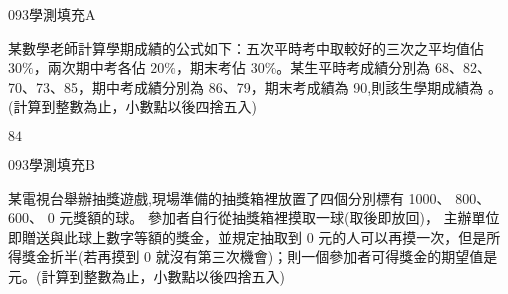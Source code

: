 \begin{QUESTIONS}
    \begin{QUESTION}
        \begin{ExamInfo}{093}{學測}{填充}{A}
        \end{ExamInfo}
        \begin{ExamAnsRateInfo}{70}{90}{77}{43}
        \end{ExamAnsRateInfo}
        \begin{QBODY}
            某數學老師計算學期成績的公式如下：五次平時考中取較好的三次之平均值佔 $30\%$，兩次期中考各佔 $20\%$，期末考佔 $30\%$。某生平時考成績分別為 68、82、70、73、85，期中考成績分別為 86、79，期末考成績為 90,則該生學期成績為 
            \TCNBOX{\TCN\TCN}。(計算到整數為止，小數點以後四捨五入)
        \end{QBODY}
        \begin{QFROMS}
        \end{QFROMS}
        \begin{QTAGS}\end{QTAGS}
        \begin{QANS}
            $84$
        \end{QANS}
        \begin{QSOLLIST}
        \end{QSOLLIST}
        \begin{QEMPTYSPACE}
        \end{QEMPTYSPACE}
    \end{QUESTION}
    \begin{QUESTION}
        \begin{ExamInfo}{093}{學測}{填充}{B}
        \end{ExamInfo}
        \begin{ExamAnsRateInfo}{25}{57}{16}{2}
        \end{ExamAnsRateInfo}
        \begin{QBODY}
            某電視台舉辦抽獎遊戲,現場準備的抽獎箱裡放置了四個分別標有 1000、 800、 600、 0 元獎額的球。
            參加者自行從抽獎箱裡摸取一球(取後即放回)，
            主辦單位即贈送與此球上數字等額的獎金，並規定抽取到 0 元的人可以再摸一次，但是所得獎金折半(若再摸到 0 就沒有第三次機會)；則一個參加者可得獎金的期望值是 
            \TCNBOX{\TCN\TCN\TCN} 元。(計算到整數為止，小數點以後四捨五入)
        \end{QBODY}
        \begin{QFROMS}
        \end{QFROMS}
        \begin{QTAGS}\end{QTAGS}

\end{QUESTION}
\end{QUESTIONS}
